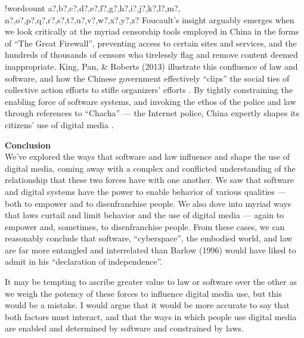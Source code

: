 \documentclass[11pt]{article}
\newcounter{words}
\newenvironment{counted}{%
  \setcounter{words}{0}
  \SearchList!{wordcount}{\stepcounter{words}}
    {a?,b?,c?,d?,e?,f?,g?,h?,i?,j?,k?,l?,m?,
    n?,o?,p?,q?,r?,s?,t?,u?,v?,w?,x?,y?,z?}
  \UndoBoundary{'}
  \SearchOrder{p;}}{%
  \StopSearching}
\newcommand{\sectitle}[1]{\textbf{#1}\\}
\begin{document}
\begin{counted}
Foucault's insight arguably emerges when we look critically at the myriad censorship tools employed in China in the forms of ``The Great Firewall'', preventing access to certain sites and services, and the hundreds of thousands of censors who tirelessly flag and remove content deemed inappropriate.
King, Pan, \& Roberts (2013) illustrate this confluence of law and software, and how the Chinese government effectively ``clips'' the social ties of collective action efforts to stifle organizers' efforts
\cite{king2014reverse}.
By tightly constraining the enabling force of software systems,
and invoking the ethos of the police and law through references to ``Chacha'' --- the Internet police,
China expertly shapes its citizens' use of digital media
\cite{king2013censorship}.


\sectitle{Conclusion}
We've explored the ways that software and law influence and shape the use of digital media,
coming away with a complex and conflicted understanding of the relationship that these two forces have
with one another.
We saw that software and digital systems have the power to enable behavior of various qualities
--- both to empower and to disenfranchise people.
We also dove into myriad ways that laws curtail and limit behavior and the use of digital media
--- again to empower and, sometimes, to disenfranchise people.
From these cases, we can reasonably conclude that software, ``cyberspace'', the embodied world, and law are far more entangled and interrelated than Barlow (1996) would have liked to admit in his ``declaration of independence''.

It may be tempting to ascribe greater value to law or software over the other
as we weigh the potency of these forces to influence digital media use,
but this would be a mistake.
I would argue that it would be more accurate to say that both factors must interact,
and that the ways in which people use digital media are enabled and determined by software and constrained by laws.



\end{counted}
\end{document}
